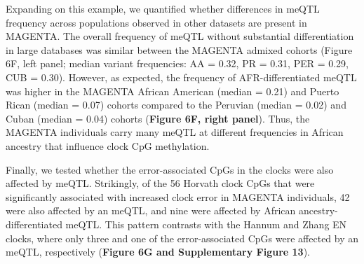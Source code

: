 
Expanding on this example, we quantified whether differences in meQTL frequency across populations observed in other datasets are present in MAGENTA. The overall frequency of meQTL without substantial differentiation in large databases was similar between the MAGENTA admixed cohorts (Figure 6F, left panel; median variant frequencies: AA = 0.32, PR = 0.31, PER = 0.29, CUB = 0.30). However, as expected, the frequency of AFR-differentiated meQTL was higher in the MAGENTA African American (median = 0.21) and Puerto Rican (median = 0.07) cohorts compared to the Peruvian (median = 0.02) and Cuban (median = 0.04) cohorts (\textbf{Figure 6F, right panel}). Thus, the MAGENTA individuals carry many meQTL at different frequencies in African ancestry that influence clock CpG methylation.

\meqtlsallclocks

Finally, we tested whether the error-associated CpGs in the clocks were also affected by meQTL. Strikingly, of the 56 Horvath clock CpGs that were significantly associated with increased clock error in MAGENTA individuals, 42 were also affected by an meQTL, and nine were affected by African ancestry-differentiated meQTL. This pattern contrasts  with the Hannum and Zhang EN clocks, where only three and one of the error-associated CpGs were affected by an meQTL, respectively (\textbf{Figure 6G and Supplementary Figure 13}). 


\clearpage